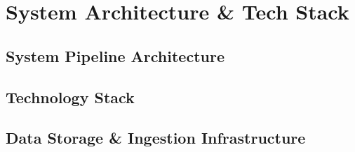 \chapter{System Architecture \& Tech Stack}
\label{chap:system_architecture}

\section{System Pipeline Architecture}

\section{Technology Stack}

\section{Data Storage \& Ingestion Infrastructure}
